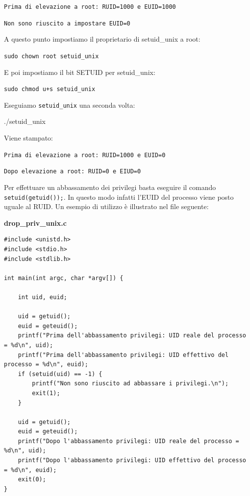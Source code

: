 \texttt{Prima di elevazione a root:
RUID=1000 e EUID=1000}

\texttt{Non sono riuscito a impostare
EUID=0}

A questo punto impostiamo il proprietario di setuid\_unix a root:
\begin{center}
    \texttt{sudo chown root setuid\_unix}
\end{center}

E poi impostiamo il bit SETUID per setuid\_unix:
\begin{center}
    \texttt{sudo chmod u+s setuid\_unix}
\end{center}

Eseguiamo \texttt{setuid\_unix} una seconda volta:
\begin{center}
    ./setuid\_unix
\end{center}

Viene stampato:

\texttt{Prima di elevazione a root:
RUID=1000 e EUID=0}

\texttt{Dopo elevazione a root:
RUID=0 e EIUD=0}

Per effettuare un abbassamento dei privilegi basta eseguire il comando \texttt{setuid(getuid());}. In questo modo infatti l'EUID del processo viene posto uguale al RUID. Un esempio di utilizzo è illustrato nel file seguente:

\begin{mdframed}[backgroundcolor=white!20,shadow=false]
\textbf{drop\_priv\_unix.c}

\begin{verbatim}
#include <unistd.h>
#include <stdio.h>
#include <stdlib.h>

int main(int argc, char *argv[]) {

	int uid, euid;

	uid = getuid();
	euid = geteuid();
	printf("Prima dell'abbassamento privilegi: UID reale del processo = %d\n", uid);
	printf("Prima dell'abbassamento privilegi: UID effettivo del processo = %d\n", euid);
	if (setuid(uid) == -1) {
		printf("Non sono riuscito ad abbassare i privilegi.\n");
		exit(1);
	}

	uid = getuid();
	euid = geteuid();
	printf("Dopo l'abbassamento privilegi: UID reale del processo = %d\n", uid);
	printf("Dopo l'abbassamento privilegi: UID effettivo del processo = %d\n", euid);
	exit(0);
}

\end{verbatim}

\end{mdframed}

